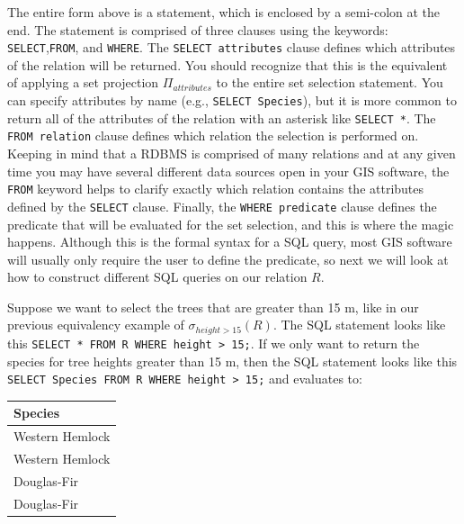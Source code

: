 \documentclass[
]{book}
\begin{document}
The entire form above is a statement, which is enclosed by a semi-colon at the end. The statement is comprised of three clauses using the keywords: \texttt{SELECT},\texttt{FROM}, and \texttt{WHERE}. The \texttt{SELECT\ attributes} clause defines which attributes of the relation will be returned. You should recognize that this is the equivalent of applying a set projection \(Π_{attributes}\) to the entire set selection statement. You can specify attributes by name (e.g., \texttt{SELECT\ Species}), but it is more common to return all of the attributes of the relation with an asterisk like \texttt{SELECT\ *}. The \texttt{FROM\ relation} clause defines which relation the selection is performed on. Keeping in mind that a RDBMS is comprised of many relations and at any given time you may have several different data sources open in your GIS software, the \texttt{FROM} keyword helps to clarify exactly which relation contains the attributes defined by the \texttt{SELECT} clause. Finally, the \texttt{WHERE\ predicate} clause defines the predicate that will be evaluated for the set selection, and this is where the magic happens. Although this is the formal syntax for a SQL query, most GIS software will usually only require the user to define the predicate, so next we will look at how to construct different SQL queries on our relation \(R\).

Suppose we want to select the trees that are greater than 15 m, like in our previous equivalency example of \(σ_{height>15}(R)\). The SQL statement looks like this \texttt{SELECT\ *\ FROM\ R\ WHERE\ height\ \textgreater{}\ 15;}. If we only want to return the species for tree heights greater than 15 m, then the SQL statement looks like this \texttt{SELECT\ Species\ FROM\ R\ WHERE\ height\ \textgreater{}\ 15;} and evaluates to:

\begin{tabular}{l}
\toprule
Species\\
\midrule
Western Hemlock\\
Western Hemlock\\
Douglas-Fir\\
Douglas-Fir\\
\bottomrule
\end{tabular}
\end{document}
